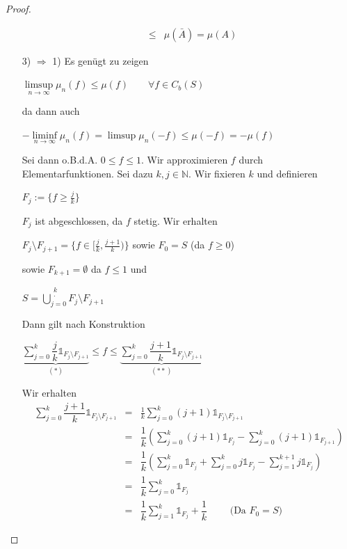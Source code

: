 \documentclass[10pt,a4paper]{report}
\newcommand{\N}{\mathbb{N}}
\numberwithin{equation}{section}
\numberwithin{figure}{section}
\theoremstyle{plain}
\theoremstyle{definition}
\theoremstyle{remark}
\theoremstyle{plain}
\newcommand{\1}{ \mathbb{1} } %
\begin{document}
\begin{proof}
\begin{itemize}
\begin{eqnarray*}
      & \leq & \mu(\bar{A})=\mu(A)
    \end{eqnarray*} 
    \item[3) $\Rightarrow$ 1)] Es genügt zu zeigen
    \begin{center}
      $\limsup\limits_{n \to \infty} \mu_n(f)\leq \mu(f) \qquad
      \forall f \in C_b(S)$
    \end{center}
    da dann auch
    \begin{center}
      $-\liminf\limits_{n \to \infty}\mu_n(f)=\limsup\mu_n(-f)\leq
      \mu(-f)=-\mu(f)$
    \end{center}
    Sei dann o.B.d.A. $0 \leq f \leq 1$. Wir approximieren $f$ durch
    Elementarfunktionen. Sei dazu $k,j \in \N$. Wir fixieren $k$ und
    definieren
    \begin{center}
      $F_j:=\{f \geq \frac{j}{k}\}$
    \end{center}
    $F_j$ ist abgeschlossen, da $f$ stetig. Wir erhalten
    \begin{center}
      $F_j\setminus F_{j+1}=\{f \in [\frac{j}{k},\frac{j+1}{k})\}$
      sowie $F_0=S$ (da $f \geq 0$)
    \end{center}
    sowie $F_{k+1}=\emptyset$ da $f \leq 1$ und
    \begin{center}
      $S=\bigcup\limits_{j=0}^{\substack{k\\\cdot}}F_j\setminus
      F_{j+1}$
    \end{center}
    Dann gilt nach Konstruktion
    \begin{center}
      $\underbrace{\sum\limits_{j=0}^k\dfrac{j}{k}\1_{F_j\setminus
          F_{j+1}}}_{(*)} \leq f \leq
      \underbrace{\sum\limits_{j=0}^k\dfrac{j+1}{k}\1_{F_j\setminus
          F_{j+1}}}_{(**)}$
    \end{center}
    Wir erhalten
    \begin{eqnarray*}
      \sum\limits_{j=0}^k\dfrac{j+1}{k}\1_{{F_j}\setminus F_{j+1}}&=&\frac{1}{k}\sum\limits_{j=0}^k(j+1)\1_{{F_j}\setminus F_{j+1}}\\
      &=&\dfrac{1}{k}\left(\sum\limits_{j=0}^k(j+1)\1_{F_j}-\sum\limits_{j=0}^k(j+1)\1_{F_{j+1}} \right)\\
      &=& \dfrac{1}{k}\left(\sum\limits_{j=0}^k \1_{F_j}+\sum\limits_{j=0}^k j\1_{F_j}-\sum\limits_{j=1}^{k+1} j \1_{F_j}\right)\\
      &=& \dfrac{1}{k}\sum\limits_{j=0}^k \1_{F_j}\\
      &=& \dfrac{1}{k}\sum\limits_{j=1}^k \1_{F_j} + \dfrac{1}{k} \qquad\text{ (Da } F_0=S)
    \end{eqnarray*}

\end{itemize}
\end{proof}
\end{document}
